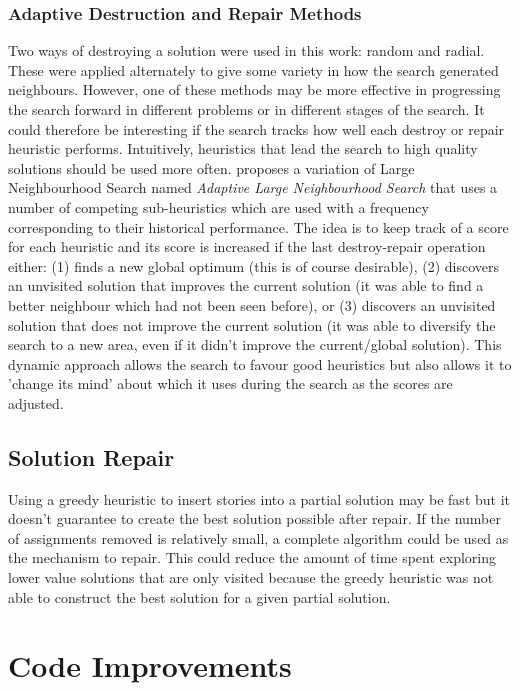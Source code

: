 \subsubsection{Adaptive Destruction and Repair Methods}
Two ways of destroying a solution were used in this work: random and radial. These were applied alternately to give some variety in how the search generated neighbours. However, one of these methods may be more effective in progressing the search forward in different problems or in different stages of the search. It could therefore be interesting if the search tracks how well each destroy or repair heuristic performs. Intuitively, heuristics that lead the search to high quality solutions should be used more often. \citet{ropke2006adaptive} proposes a variation of Large Neighbourhood Search named \emph{Adaptive Large Neighbourhood Search} that uses a number of competing sub-heuristics which are used with a frequency corresponding to their historical performance. The idea is to keep track of a score for each heuristic and its score is increased if the last destroy-repair operation either: (1) finds a new global optimum (this is of course desirable), (2) discovers an unvisited solution that improves the current solution (it was able to find a better neighbour which had not been seen before), or (3) discovers an unvisited solution that does not improve the current solution (it was able to diversify the search to a new area, even if it didn't improve the current/global solution). This dynamic approach allows the search to favour good heuristics but also allows it to 'change its mind' about which it uses during the search as the scores are adjusted.

\subsection{Solution Repair}
Using a greedy heuristic to insert stories into a partial solution may be fast but it doesn't guarantee to create the best solution possible after repair. If the number of assignments removed is relatively small, a complete algorithm could be used as the mechanism to repair. This could reduce the amount of time spent exploring lower value solutions that are only visited because the greedy heuristic was not able to construct the best solution for a given partial solution.

\section{Code Improvements}

